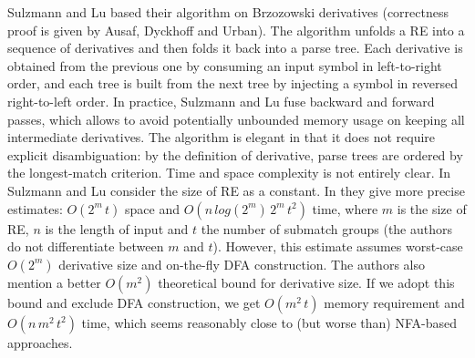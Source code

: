 \documentclass[AMA,STIX1COL]{WileyNJD-v2}
\begin{document}
Sulzmann and Lu based their algorithm on Brzozowski derivatives \cite{SL14}
(correctness proof is given by Ausaf, Dyckhoff and Urban\cite{ADU16}).
The algorithm unfolds a RE into a sequence of derivatives
and then folds it back into a parse tree.
Each derivative is obtained from the previous one by consuming an input symbol in left-to-right order,
and each tree is built from the next tree by injecting a symbol in reversed right-to-left order.
In practice, Sulzmann and Lu fuse backward and forward passes,
which allows to avoid potentially unbounded memory usage on keeping all intermediate derivatives.
The algorithm is elegant in that it does not require explicit disambiguation:
by the definition of derivative, parse trees are ordered by the longest-match criterion.
Time and space complexity is not entirely clear.
In \cite{SL14} Sulzmann and Lu consider the size of RE as a constant.
In \cite{SL13} they give more precise estimates: $O(2^m \, t)$ space and $O(n \, log(2^m) \, 2^m \, t^2)$ time,
where $m$ is the size of RE,
$n$ is the length of input
and $t$ the number of submatch groups (the authors do not differentiate between $m$ and $t$).
However, this estimate assumes worst-case $O(2^m)$ derivative size and on-the-fly DFA construction.
The authors also mention a better $O(m^2)$ theoretical bound for derivative size.
If we adopt this bound and exclude DFA construction, we get $O(m^2 \, t)$ memory requirement and $O(n \, m^2 \, t^2)$ time,
which seems reasonably close to (but worse than) NFA-based approaches.
\\
\end{document}
